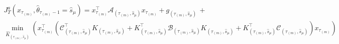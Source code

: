 \documentclass[journal,twoside,web]{ieeecolor}
\begin{document}
\begin{figure*}[ht]
\raggedright
\begin{align}\label{eq:cost-tau2}
\begin{aligned}
 & J_{T}^{a}(x_{\tau_{(m)}},\hat{\theta}_{\tau_{(m)}-1}=\hat{s}_{\mu}) = 
    x_{\tau_{(m)}}^{\top}\mathcal{A}_{(\tau_{(m)},\hat{s}_{\mu})}x_{\tau_{(m)}}^{} \!+ g_{(\tau_{(m)},\hat{s}_{\mu})} \,+ \\
    & \min_{\hat{K}_{(\tau_{(m)},\hat{s}_{\mu})}} \left(\! x_{\tau_{(m)}}^{\top} \left( 
    \mathcal{C}_{(\tau_{(m)},\hat{s}_{\mu})}^{\top} K_{(\tau_{(m)},\hat{s}_{\mu})} + K_{(\tau_{(m)},\hat{s}_{\mu})}^{\top} \mathcal{B}_{(\tau_{(m)},\hat{s}_{\mu})} K_{(\tau_{(m)},\hat{s}_{\mu})}^{} + 
    K_{(\tau_{(m)},\hat{s}_{\mu})}^{\top}\mathcal{C}_{(\tau_{(m)},\hat{s}_{\mu})}^{} \right) x_{\tau_{(m)}} \right)
\end{aligned}
\end{align}
\end{figure*}
\end{document}
